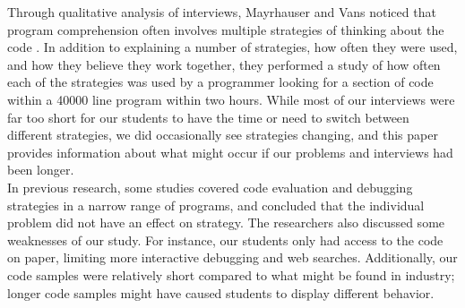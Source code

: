 Through qualitative analysis of interviews, Mayrhauser and Vans noticed that program comprehension often involves multiple strategies of thinking about the code \cite{402076}.
In addition to explaining a number of strategies, how often they were used, and how they believe they work together, they performed a study of how often each of the strategies was used by a programmer looking for a section of code within a 40000 line program within two hours.
While most of our interviews were far too short for our students to have the time or need to switch between different strategies, we did occasionally see strategies changing, and this paper provides information about what might occur if our problems and interviews had been longer. \\

In previous research, some studies covered code evaluation and debugging strategies in a narrow range of programs, and concluded that the individual problem did not have an effect on strategy.
The researchers also discussed some weaknesses of our study. For instance, our students only had access to the code on paper, limiting more interactive debugging and web searches.
Additionally, our code samples were relatively short compared to what might be found in industry;
 longer code samples might have caused students to display different behavior.

\newpage
